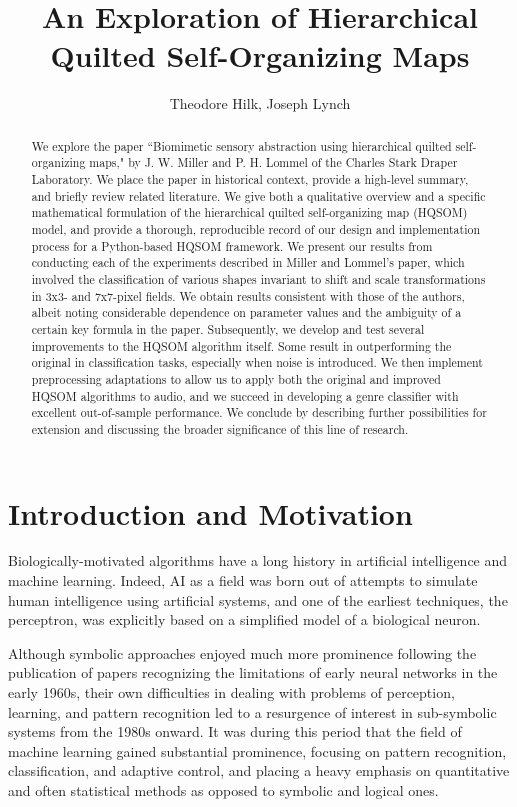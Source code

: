 \documentclass[a4paper,10pt]{article}
\title{An Exploration of Hierarchical Quilted Self-Organizing Maps}
\author{Theodore Hilk, Joseph Lynch}
\begin{document}
\maketitle

\begin{abstract}
\noindent We explore the paper ``Biomimetic sensory abstraction using hierarchical quilted
self-organizing maps," by J. W. Miller and P. H. Lommel of the Charles Stark Draper Laboratory. We
place the paper in historical context, provide a high-level summary, and briefly review related
literature. We give both a qualitative overview and a specific mathematical formulation of the
hierarchical quilted self-organizing map (HQSOM) model, and provide a thorough, reproducible record
of our design and implementation process for a Python-based HQSOM framework. We present our results
from conducting each of the experiments described in Miller and Lommel's paper, which involved the
classification of various shapes invariant to shift and scale transformations in 3x3- and 7x7-pixel
fields. We obtain results consistent with those of the authors, albeit noting considerable
dependence on parameter values and the ambiguity of a certain key formula in the paper.
Subsequently, we develop and test several improvements to the HQSOM algorithm itself.  Some
result in outperforming the original in classification tasks, especially when noise is introduced.
We then implement preprocessing adaptations to allow us to apply both the original and improved
HQSOM algorithms to audio, and we succeed in developing a genre classifier with excellent
out-of-sample performance. We conclude by describing further possibilities for extension and
discussing the broader significance of this line of research.
\end{abstract}
\section{Introduction and Motivation}

Biologically-motivated algorithms have a long history in artificial intelligence and machine
learning. Indeed, AI as a field was born out of attempts to simulate human intelligence using
artificial systems\cite{AIHistory1}, and one of the earliest techniques, the perceptron, was
explicitly based on a simplified model of a biological neuron.\cite{Rosenblatt}

Although symbolic approaches enjoyed much more prominence following the publication of papers
recognizing the limitations of early neural networks in the early 1960s\cite{DreyfusMind}, their own
difficulties in dealing with problems of perception, learning, and pattern recognition led to a
resurgence of interest in sub-symbolic systems from the 1980s onward.\cite{AIHistory1, AIHistory2,
MLHistory1} It was during this period that the field of machine learning gained substantial
prominence, focusing on pattern recognition, classification, and adaptive control, and placing a
heavy emphasis on quantitative and often statistical methods as opposed to symbolic and logical
ones.\cite{MLHistory1}
\end{document}
